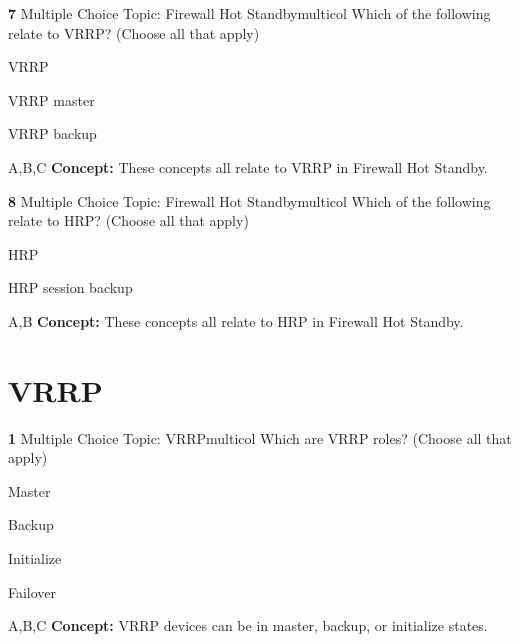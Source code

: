 \documentclass[10pt,a4paper]{article}
\begin{document}
\begin{qcard}{\color{white}\textbf{7} \hfill \small Multiple Choice \textbar{} Topic: Firewall Hot Standby}{multicol}
Which of the following relate to VRRP? (Choose all that apply)

\begin{qoptions}
\item VRRP
\item VRRP master
\item VRRP backup
\end{qoptions}
\begin{explainbox}{A,B,C}
\textbf{Concept:} These concepts all relate to VRRP in Firewall Hot Standby.
\end{explainbox}
\end{qcard}

\begin{qcard}{\color{white}\textbf{8} \hfill \small Multiple Choice \textbar{} Topic: Firewall Hot Standby}{multicol}
Which of the following relate to HRP? (Choose all that apply)

\begin{qoptions}
\item HRP
\item HRP session backup
\end{qoptions}
\begin{explainbox}{A,B}
\textbf{Concept:} These concepts all relate to HRP in Firewall Hot Standby.
\end{explainbox}
\end{qcard}

\section{VRRP}
\begin{qcard}{\color{white}\textbf{1} \hfill \small Multiple Choice \textbar{} Topic: VRRP}{multicol}
Which are VRRP roles? (Choose all that apply)

\begin{qoptions}
\item Master
\item Backup
\item Initialize
\item Failover
\end{qoptions}
\begin{explainbox}{A,B,C}
\textbf{Concept:} VRRP devices can be in master, backup, or initialize states.
\end{explainbox}
\end{qcard}
\end{document}
